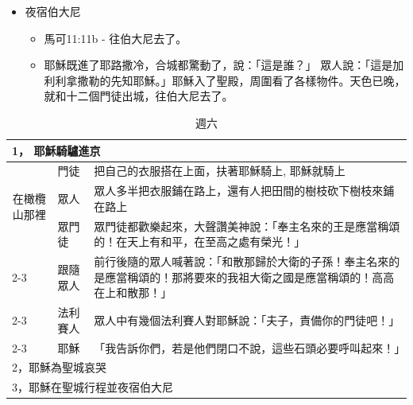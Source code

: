 \begin{itemize}
\item 夜宿伯大尼
\begin{itemize}
\item 馬可11:11b - 往伯大尼去了。
\item 耶穌既進了耶路撒冷，合城都驚動了，說：「這是誰？」 眾人說：「這是加利利拿撒勒的先知耶穌。」耶穌入了聖殿，周圍看了各樣物件。天色已晚，就和十二個門徒出城，往伯大尼去了。
\end{itemize}
\end{itemize}

\begin{table}[htbp] \centering  
\begin{tabular}{l|l|l} \toprule
\multicolumn{3}{l}{1， 耶穌騎驢進京} \\\midrule
\multicolumn{1}{c|}{\multirow{3}{*}{在橄欖山那裡}} & 門徒    & \multicolumn{1}{|p{29.9em}}{把自己的衣服搭在上面，扶著耶穌騎上, 耶穌就騎上}  \\
\cmidrule{2-3}          & \multicolumn{1}{l|}{ 眾人} & \multicolumn{1}{|p{29.9em}}{眾人多半把衣服鋪在路上，還有人把田間的樹枝砍下樹枝來鋪在路上}  \\    \midrule
 & 眾門徒   & \multicolumn{1}{|p{29.9em}}{眾門徒都歡樂起來，大聲讚美神說：「奉主名來的王是應當稱頌的！在天上有和平，在至高之處有榮光！」}   \\
\cmidrule{2-3}          & \multicolumn{1}{l}{跟隨眾人} &\multicolumn{1}{|p{32.9em}}{ 前行後隨的眾人喊著說：「和散那歸於大衛的子孫！奉主名來的是應當稱頌的！那將要來的我祖大衛之國是應當稱頌的！高高在上和散那！」} \\    
\cmidrule{2-3}    \multicolumn{1}{p{7em}|}{下橄欖山的時候} & 法利賽人  &  \multicolumn{1}{|p{29.9em}}{眾人中有幾個法利賽人對耶穌說：「夫子，責備你的門徒吧！」} \\
\cmidrule{2-3}          & 耶穌    & \multicolumn{1}{|p{29.9em}}{「我告訴你們，若是他們閉口不說，這些石頭必要呼叫起來！」} \\   \midrule  
\multicolumn{3}{l}{2，耶穌為聖城哀哭} \\\midrule
\multicolumn{3}{l}{3，耶穌在聖城行程並夜宿伯大尼} \\\bottomrule
 \end{tabular}%
 \caption{週六}\label{tab:addlabel}%
\end{table}%